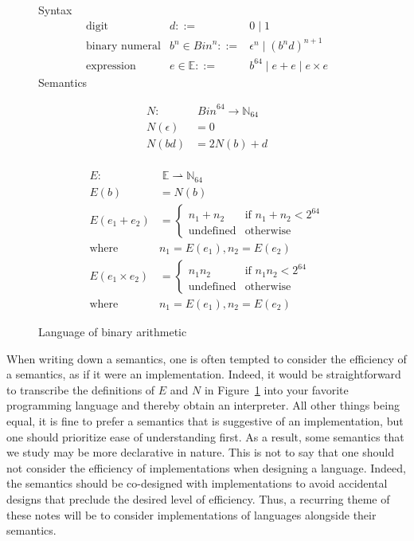 \documentclass{tufte-handout}
\newcommand{\BR}[1]{(#1)}
\newcommand{\pto}[0]{\rightharpoonup}
\newcommand{\BIN}[0]{\mathit{Bin}}
\newcommand{\FNAT}[0]{\mathbb{N}_{64}}
\newcommand{\EXP}[0]{\mathbb{E}}
\begin{document}
\begin{figure}[tbp]
\noindent Syntax
\[
\begin{array}{lrl}
 \text{digit}& d ::=& 0 \mid 1 \\
 \text{binary numeral}& b^n \in \BIN^n ::=& \epsilon^n \mid (b^nd)^{n+1} \\
 \text{expression}& e \in \EXP ::=& b^{64} \mid e + e \mid e \times e
\end{array}
\]
Semantics\\
\begin{minipage}{0.4\textwidth}
  \begin{align*}
 N : & \; \BIN^{64} \to \FNAT \\
 N\BR{ \epsilon } &= 0 \\
 N\BR{ b d } &= 2 N\BR{ b } + d \\[1ex]
\end{align*}
\end{minipage}
\begin{minipage}{0.6\textwidth}
  \begin{align*}
E : & \; \EXP \pto \FNAT \\
E\BR{ b } &= N\BR{ b } \\
E\BR{ e_1 + e_2 } &=
\begin{cases}
   n_1 + n_2 & \text{if } n_1 + n_2 < 2^{64}\\
   \mathrm{undefined} & \text{otherwise}
\end{cases}\\
 \text{where } & n_1 = E\BR{ e_1 }, n_2 = E\BR{ e_2 } \\
 E\BR{ e_1 \times e_2 } &= 
\begin{cases}
   n_1 n_2 & \text{if } n_1 n_2 < 2^{64}\\
   \mathrm{undefined} & \text{otherwise}
\end{cases}\\
 \text{where } & n_1 = E\BR{ e_1 }, n_2 = E\BR{ e_2 } 
\end{align*}
\end{minipage}
\caption{Language of binary arithmetic}
\label{fig:binary-arithmetic}
\end{figure}

When writing down a semantics, one is often tempted to consider the
efficiency of a semantics, as if it were an implementation. Indeed, it
would be straightforward to transcribe the definitions of $E$ and $N$
in Figure~\ref{fig:binary-arithmetic} into your favorite programming
language and thereby obtain an interpreter. All other things being
equal, it is fine to prefer a semantics that is suggestive of an
implementation, but one should prioritize ease of understanding first.
As a result, some semantics that we study may be more declarative in
nature. This is not to say that one should not consider the efficiency
of implementations when designing a language.  Indeed, the semantics
should be co-designed with implementations to avoid accidental designs
that preclude the desired level of efficiency.  Thus, a recurring
theme of these notes will be to consider implementations of languages
alongside their semantics.
\end{document}
